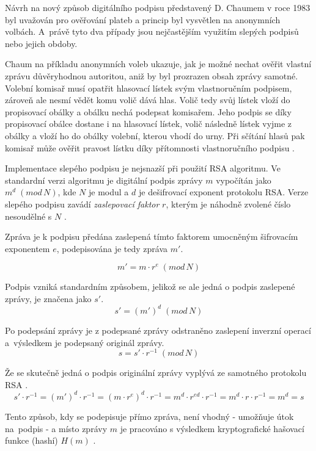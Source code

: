 Návrh na nový způsob digitálního podpisu představený D. Chaumem v roce 1983 byl uvažován pro ověřování plateb a princip byl vysvětlen na anonymních volbách. A~právě tyto dva případy jsou nejčastějším využitím slepých podpisů nebo jejich obdoby. 

Chaum na příkladu anonymních voleb ukazuje, jak je možné nechat ověřit vlastní zprávu důvěryhodnou autoritou, aniž by byl prozrazen obsah zprávy samotné.  Volební komisař musí opatřit hlasovací lístek svým vlastnoručním podpisem, zároveň ale nesmí vědět komu volič dává hlas. Volič tedy svůj lístek vloží do propisovací obálky a obálku nechá podepsat komisařem. Jeho podpis se díky propisovací obálce dostane i na hlasovací lístek, volič následně lístek vyjme z obálky a vloží ho do obálky volební, kterou vhodí do urny. Při sčítání hlasů pak komisař může ověřit pravost lístku díky přítomnosti vlastnoručního podpisu \cite{chaum}.

Implementace slepého podpisu je nejsnazší při použití RSA algoritmu. Ve standardní verzi algoritmu je digitální podpis zprávy $m$ vypočítán jako $m^d\;(mod\,N)$, kde $N$ je modul a $d$ je dešifrovací exponent protokolu RSA. Verze slepého podpisu zavádí \textit{zaslepovací faktor} $r$, kterým je náhodně zvolené číslo nesoudělné s $N$ \cite{chaum}.

Zpráva je k podpisu předána zaslepená tímto faktorem umocněným šifrovacím exponentem $e$, podepisována je tedy zpráva $m'$.

\[ m' = m \cdot r^e\;(mod\,N) \]

Podpis vzniká standardním způsobem, jelikož se ale jedná o podpis zaslepené zprávy, je značena jako $s'$.
\[ s' = (m')^d \; (mod\,N) \]

Po podepsání zprávy je z podepsané zprávy odstraněno zaslepení inverzní operací a~výsledkem je podepsaný originál zprávy.
\[ s = s' \cdot r^{-1} \;(mod\,N) \]

Že se skutečně jedná o podpis originální zprávy vyplývá ze samotného protokolu RSA \cite{rsa}.
\[ s' \cdot r^{-1} = (m')^d \cdot r^{-1} = (m \cdot r^e)^d \cdot r^{-1} = 
	m^d \cdot r^{ed} \cdot r^{-1} = m^d \cdot r \cdot r^{-1} = m^d = s
\]

Tento způsob, kdy se podepisuje přímo zpráva, není vhodný - umožňuje útok na~podpis - a místo zprávy $m$ je pracováno s výsledkem kryptografické hašovací funkce (hashí) $H(m)$ \cite{RsaAdventures}.